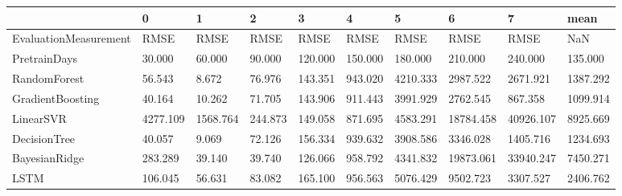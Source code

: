 \begin{tabular}{llllllllll}
\toprule
{} &        0 &        1 &       2 &       3 &       4 &        5 &         6 &         7 &     mean \\
\midrule
EvaluationMeasurement &     RMSE &     RMSE &    RMSE &    RMSE &    RMSE &     RMSE &      RMSE &      RMSE &      NaN \\
PretrainDays          &   30.000 &   60.000 &  90.000 & 120.000 & 150.000 &  180.000 &   210.000 &   240.000 &  135.000 \\
RandomForest          &   56.543 &    8.672 &  76.976 & 143.351 & 943.020 & 4210.333 &  2987.522 &  2671.921 & 1387.292 \\
GradientBoosting      &   40.164 &   10.262 &  71.705 & 143.906 & 911.443 & 3991.929 &  2762.545 &   867.358 & 1099.914 \\
LinearSVR             & 4277.109 & 1568.764 & 244.873 & 149.058 & 871.695 & 4583.291 & 18784.458 & 40926.107 & 8925.669 \\
DecisionTree          &   40.057 &    9.069 &  72.126 & 156.334 & 939.632 & 3908.586 &  3346.028 &  1405.716 & 1234.693 \\
BayesianRidge         &  283.289 &   39.140 &  39.740 & 126.066 & 958.792 & 4341.832 & 19873.061 & 33940.247 & 7450.271 \\
LSTM                  &  106.045 &   56.631 &  83.082 & 165.100 & 956.563 & 5076.429 &  9502.723 &  3307.527 & 2406.762 \\
\bottomrule
\end{tabular}
